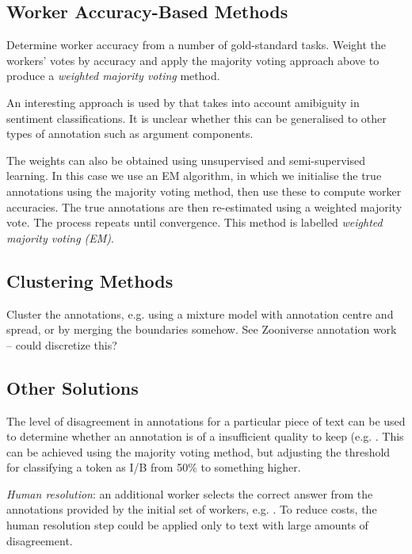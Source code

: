 \subsection{Worker Accuracy-Based Methods}

Determine worker accuracy from a number of gold-standard tasks. Weight the workers' votes by accuracy and apply the majority voting approach above to produce a \emph{weighted majority voting} method.

An interesting approach is used by \cite{hsueh2009data} that takes into account amibiguity in sentiment classifications. It is unclear whether this can be generalised to other types of annotation such as argument components. 

The weights can also be obtained using unsupervised and semi-supervised learning. In this case we use an EM algorithm, in which we initialise the true annotations using the majority voting method, then use these to compute worker accuracies. The true annotations are then re-estimated using a weighted majority vote. The process repeats until convergence. This method is labelled \emph{weighted majority voting (EM)}. 

\subsection{Clustering Methods}

Cluster the annotations, e.g. using a mixture model with annotation centre and spread, or by merging the boundaries somehow. See Zooniverse annotation work -- could discretize this?

\subsection{Other Solutions}

The level of disagreement in annotations for a particular piece of text can be used to determine whether an annotation is of a insufficient quality to keep (e.g. \cite{sayeed2011crowdsourcing,hsueh2009data}. This can be achieved using the majority voting method, but adjusting the threshold for classifying a token as I/B from 50\% to something higher. 

\emph{Human resolution}: an additional worker selects the correct answer from the annotations provided by the initial set of workers, e.g. \cite{dagan2016specifying}. To reduce costs, the human resolution step could be applied only to text with large amounts of disagreement.

